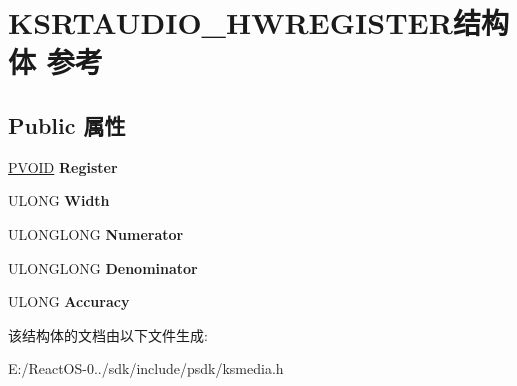 \hypertarget{struct_k_s_r_t_a_u_d_i_o___h_w_r_e_g_i_s_t_e_r}{}\section{K\+S\+R\+T\+A\+U\+D\+I\+O\+\_\+\+H\+W\+R\+E\+G\+I\+S\+T\+E\+R结构体 参考}
\label{struct_k_s_r_t_a_u_d_i_o___h_w_r_e_g_i_s_t_e_r}
\subsection*{Public 属性}
\begin{DoxyCompactItemize}
\item 
\mbox{\label{struct_k_s_r_t_a_u_d_i_o___h_w_r_e_g_i_s_t_e_r_a47d0e3fadfa378e98dd3381f66a2d16a}} 
\hyperlink{interfacevoid}{P\+V\+O\+ID} {\bfseries Register}
\item 
\mbox{\label{struct_k_s_r_t_a_u_d_i_o___h_w_r_e_g_i_s_t_e_r_a1ccef95435812649d35668b6b9dc71f3}} 
U\+L\+O\+NG {\bfseries Width}
\item 
\mbox{\label{struct_k_s_r_t_a_u_d_i_o___h_w_r_e_g_i_s_t_e_r_a51e8422ef5e33794fd63ccdd1748fc51}} 
U\+L\+O\+N\+G\+L\+O\+NG {\bfseries Numerator}
\item 
\mbox{\label{struct_k_s_r_t_a_u_d_i_o___h_w_r_e_g_i_s_t_e_r_a1fa61ee013f08e0c69fe843d54ecc672}} 
U\+L\+O\+N\+G\+L\+O\+NG {\bfseries Denominator}
\item 
\mbox{\label{struct_k_s_r_t_a_u_d_i_o___h_w_r_e_g_i_s_t_e_r_add001f0689bf3a3943f8e83ef2c33fe3}} 
U\+L\+O\+NG {\bfseries Accuracy}
\end{DoxyCompactItemize}


该结构体的文档由以下文件生成\+:\begin{DoxyCompactItemize}
\item 
E\+:/\+React\+O\+S-\/0../sdk/include/psdk/ksmedia.\+h\end{DoxyCompactItemize}
